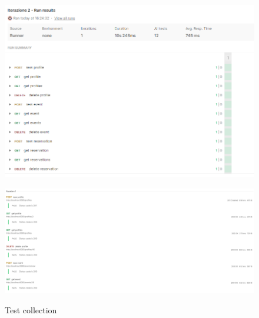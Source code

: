 \begin{figure}[h!]
\begin{center}
  \includegraphics[width=14cm]{test/postman/collections.PNG}\\
  \caption{Test collection}
  \includegraphics[width=30cm]{test/postman/collections sng.PNG}\\
\end{center}
\end{figure}
